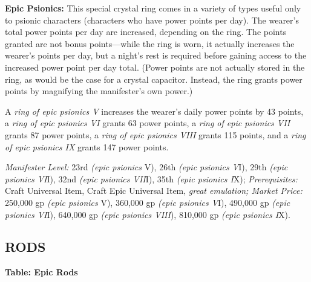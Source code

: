 \documentclass{article}
\begin{document}
\textbf{Epic Psionics: }This special crystal ring comes in a variety of types useful 
only to psionic characters (characters who have power points per day). The wearer's 
total power points per day are increased, depending on the ring. The points granted 
are not bonus points---while the ring is worn, it actually increases the wearer's 
points per day, but a night's rest is required before gaining access to the increased 
power point per day total. (Power points are not actually stored in the ring, as 
would be the case for a crystal capacitor. Instead, the ring grants power points 
by magnifying the manifester's own power.) 

A \textit{ring of epic psionics V }increases the wearer's daily power points by 
43 points, a \textit{ring of epic psionics VI }grants 63 power points, a \textit{ring 
of epic psionics VII }grants 87 power points, a \textit{ring of epic psionics VIII 
}grants 115 points, and a \textit{ring of epic psionics IX }grants 147 power points. 

\textit{Manifester Level: }23rd \textit{(epic psionics }V), 26th \textit{(epic 
psionics V}I), 29th \textit{(epic psionics VI}I), 32nd \textit{(epic psionics VII}I), 
35th \textit{(epic psionics I}X); \textit{Prerequisites: }Craft Universal Item, 
Craft Epic Universal Item, \textit{great emulation; Market Price: }250,000 gp \textit{(epic 
psionics }V), 360,000 gp \textit{(epic psionics V}I), 490,000 gp \textit{(epic 
psionics VI}I), 640,000 gp \textit{(epic psionics VIII}), 810,000 gp \textit{(epic 
psionics I}X). 

\vspace{12pt}
\subsection*{{\LARGE{}RODS }}

\vspace{12pt}
\textbf{Table: Epic Rods }
\end{document}
